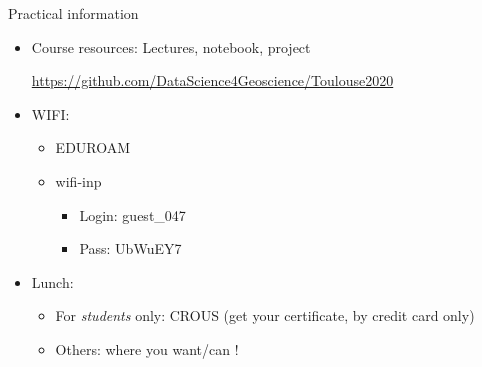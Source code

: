 \documentclass[pressentation,10pt,aspectratio=1610, xcolor=table]{beamer}
\begin{document}
\begin{frame}[label={sec:org570f7bf}]{Practical information}
\begin{itemize}
\item Course resources: Lectures, notebook, project
\begin{center}
\url{https://github.com/DataScience4Geoscience/Toulouse2020}
\end{center}
\item WIFI:
\begin{itemize}
\item EDUROAM
\item wifi-inp
\begin{itemize}
\item Login: guest\_047
\item Pass: UbWuEY7
\end{itemize}
\end{itemize}
\item Lunch:
\begin{itemize}
\item For \emph{students} only: CROUS (get your certificate, by credit card only)
\item Others: where you want/can !
\end{itemize}
\end{itemize}
\end{frame}
\end{document}
